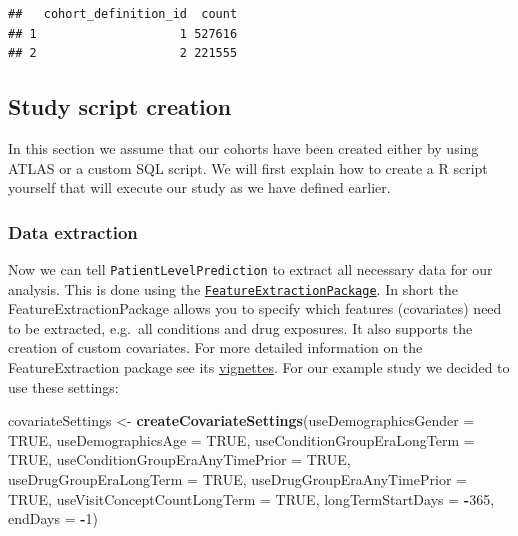 \documentclass[]{article}
\newenvironment{Shaded}{\begin{snugshade}}{\end{snugshade}}
\newcommand{\KeywordTok}[1]{\textcolor[rgb]{0.13,0.29,0.53}{\textbf{#1}}}
\newcommand{\DataTypeTok}[1]{\textcolor[rgb]{0.13,0.29,0.53}{#1}}
\newcommand{\DecValTok}[1]{\textcolor[rgb]{0.00,0.00,0.81}{#1}}
\newcommand{\StringTok}[1]{\textcolor[rgb]{0.31,0.60,0.02}{#1}}
\newcommand{\OtherTok}[1]{\textcolor[rgb]{0.56,0.35,0.01}{#1}}
\newcommand{\OperatorTok}[1]{\textcolor[rgb]{0.81,0.36,0.00}{\textbf{#1}}}
\newcommand{\NormalTok}[1]{#1}
\begin{document}
\begin{verbatim}
##   cohort_definition_id  count
## 1                    1 527616
## 2                    2 221555
\end{verbatim}

\subsection{Study script creation}\label{study-script-creation}

In this section we assume that our cohorts have been created either by
using ATLAS or a custom SQL script. We will first explain how to create
a R script yourself that will execute our study as we have defined
earlier.

\subsubsection{Data extraction}\label{data-extraction}

Now we can tell \texttt{PatientLevelPrediction} to extract all necessary
data for our analysis. This is done using the
\href{https://github.com/OHDSI/FeatureExtration}{\texttt{FeatureExtractionPackage}}.
In short the FeatureExtractionPackage allows you to specify which
features (covariates) need to be extracted, e.g.~all conditions and drug
exposures. It also supports the creation of custom covariates. For more
detailed information on the FeatureExtraction package see its
\href{https://github.com/OHDSI/FeatureExtration}{vignettes}. For our
example study we decided to use these settings:

\begin{Shaded}
\begin{Highlighting}[]
\NormalTok{covariateSettings <-}\StringTok{ }\KeywordTok{createCovariateSettings}\NormalTok{(}\DataTypeTok{useDemographicsGender =} \OtherTok{TRUE}\NormalTok{,}
                                             \DataTypeTok{useDemographicsAge =} \OtherTok{TRUE}\NormalTok{,}
                                             \DataTypeTok{useConditionGroupEraLongTerm =} \OtherTok{TRUE}\NormalTok{,}
                                             \DataTypeTok{useConditionGroupEraAnyTimePrior =} \OtherTok{TRUE}\NormalTok{,}
                                             \DataTypeTok{useDrugGroupEraLongTerm =} \OtherTok{TRUE}\NormalTok{,}
                                             \DataTypeTok{useDrugGroupEraAnyTimePrior =} \OtherTok{TRUE}\NormalTok{,}
                                             \DataTypeTok{useVisitConceptCountLongTerm =} \OtherTok{TRUE}\NormalTok{,}
                                             \DataTypeTok{longTermStartDays =} \OperatorTok{-}\DecValTok{365}\NormalTok{,}
                                             \DataTypeTok{endDays =} \OperatorTok{-}\DecValTok{1}\NormalTok{)}
\end{Highlighting}
\end{Shaded}
\end{document}

